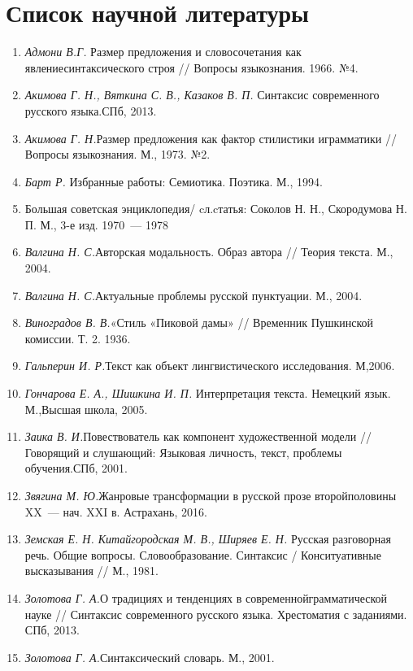     \chapter{Список научной литературы}
      \begin{enumerate}
        \item \textit{Адмони В.Г.} Размер предложения и словосочетания как явлениесинтаксического строя // Вопросы языкознания.  1966. №4. 
        \item \textit{Акимова Г. Н., Вяткина С. В., Казаков В. П. }Синтаксис современного русского языка.СПб, 2013. 
        \item \textit{Акимова Г. Н.}Размер предложения как фактор стилистики играмматики // Вопросы языкознания. М., 1973. №2.
        \item \textit{Барт Р.} Избранные работы: Семиотика. Поэтика. М., 1994.
        \item Большая советская энциклопедия/ cл.cтатья: Соколов Н. Н., Скородумова Н. П. М., 3-е изд. 1970~--- 1978
        \item \textit{Валгина Н. С.}Авторская модальность. Образ автора // Теория текста. М., 2004. 
        \item \textit{Валгина Н. С.}Актуальные проблемы русской пунктуации. М., 2004.
        \item \textit{Виноградов В. В.}«Стиль «Пиковой дамы» // Временник Пушкинской комиссии. Т. 2. 1936. 
        \item \textit{Гальперин И. Р.}Текст как объект лингвистического исследования. М,2006. 
        \item \textit{Гончарова Е. А., Шишкина И. П. }Интерпретация текста. Немецкий язык. М.,Высшая школа, 2005.
        \item \textit{Заика В. И.}Повествователь как компонент художественной модели // Говорящий и слушающий: Языковая личность, текст, проблемы обучения.СПб, 2001.
        \item \textit{Звягина М. Ю.}Жанровые трансформации в русской прозе второйполовины XX~--- нач. XXI в. Астрахань, 2016.
        \item \textit{Земская Е. Н. Китайгородская М. В., Ширяев Е. Н. }Русская разговорная речь. Общие вопросы. Словообразование. Синтаксис / Конситуативные высказывания // М., 1981.
        \item \textit{Золотова Г. А.}О традициях и тенденциях в современнойграмматической науке // Синтаксис современного русского языка. Хрестоматия с заданиями. СПб, 2013. 
        \item \textit{Золотова Г. А.}Синтаксический словарь. М., 2001.

\end{enumerate}
